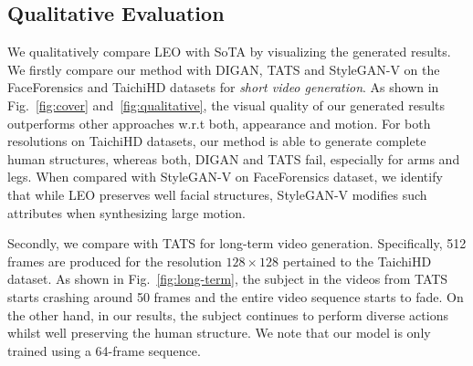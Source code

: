 \subsection{Qualitative Evaluation}
We qualitatively compare LEO with SoTA by visualizing the generated results. We firstly compare our method with DIGAN, TATS and StyleGAN-V on the FaceForensics and TaichiHD datasets for \textit{short video generation}. As shown in Fig.~\ref{fig:cover} and~\ref{fig:qualitative}, the visual quality of our generated results outperforms other approaches w.r.t both, appearance and motion. For both resolutions on TaichiHD datasets, our method is able to generate complete human structures, whereas both, DIGAN and TATS fail, especially for arms and legs. When compared with StyleGAN-V on FaceForensics dataset, we identify that while LEO preserves well facial structures, StyleGAN-V modifies such attributes when synthesizing large motion. 

Secondly, we compare with TATS for long-term video generation. Specifically, 512 frames are produced for the resolution $128\times 128$ pertained to the TaichiHD dataset. As shown in Fig.~\ref{fig:long-term}, the subject in the videos from TATS starts crashing around 50 frames and the entire video sequence starts to fade. On the other hand, in our results, the subject continues to perform diverse actions whilst well preserving the human structure. We note that our model is only trained using a 64-frame sequence.

